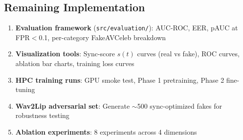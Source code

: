 \documentclass[12pt, letterpaper]{article}
\begin{document}
\subsection{Remaining Implementation}

\begin{enumerate}[itemsep=2pt, leftmargin=1.5em]
    \item \textbf{Evaluation framework} (\texttt{src/evaluation/}): AUC-ROC, EER, pAUC at FPR$<$0.1, per-category FakeAVCeleb breakdown
    \item \textbf{Visualization tools}: Sync-score $s(t)$ curves (real vs fake), ROC curves, ablation bar charts, training loss curves
    \item \textbf{HPC training runs}: GPU smoke test, Phase 1 pretraining, Phase 2 fine-tuning
    \item \textbf{Wav2Lip adversarial set}: Generate $\sim$500 sync-optimized fakes for robustness testing
    \item \textbf{Ablation experiments}: 8 experiments across 4 dimensions
\end{enumerate}
\end{document}
